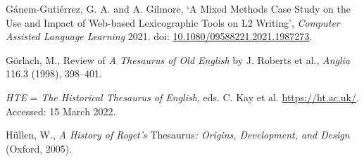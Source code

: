 \begin{list}{}

\item %
Gánem-Gutiérrez, G. A. and A. Gilmore, `A Mixed Methods Case Study on the Use and Impact of Web-based Lexicographic Tools on L2 Writing', \textit{Computer Assisted Language Learning} 2021. doi: \href{https://doi.org/10.1080/09588221.2021.1987273}{\url{10.1080/09588221.2021.1987273}}.

\item %
Görlach, M., Review of \textit{A Thesaurus of Old English} by J. Roberts et al., \textit{Anglia} 116.3 (1998), 398–401.







\item %
\textit{HTE} = \textit{The Historical Thesaurus of English}, eds. C. Kay et al. \url{https://ht.ac.uk/}. Accessed: 15 March 2022.

\item %
Hüllen, W., \textit{A History of Roget's} Thesaurus\textit{: Origins, Development, and Design} (Oxford, 2005).


\end{list}
